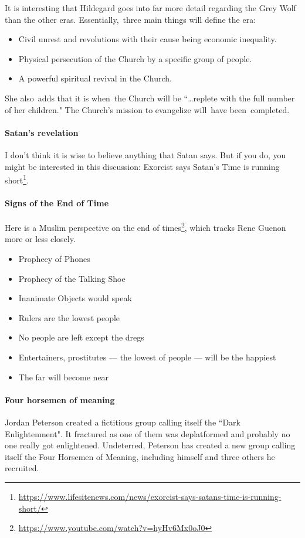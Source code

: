 \begin{quotex}
It is interesting that Hildegard goes into far more detail regarding the Grey Wolf than the other eras. Essentially, three main things will define the era:

\begin{itemize}
\item Civil unrest and revolutions with their cause being economic inequality. 
\item Physical persecution of the Church by a specific group of people. 
\item A powerful spiritual revival in the Church. 
\end{itemize}

She also adds that it is when the Church will be ``…replete with the full number of her children." The Church's mission to evangelize will have been completed.

\end{quotex}
\paragraph{Satan's revelation}
I don't think it is wise to believe anything that Satan says. But if you do, you might be interested in this discussion: Exorcist says Satan's Time is running short\footnote{\url{https://www.lifesitenews.com/news/exorcist-says-satans-time-is-running-short/}}.

\paragraph{Signs of the End of Time}
Here is a Muslim perspective on the end of times\footnote{\url{https://www.youtube.com/watch?v=hyHv6Mx0oJ0}}, which tracks Rene Guenon more or less closely.

\begin{itemize}
\item Prophecy of Phones 
\item Prophecy of the Talking Shoe 
\item Inanimate Objects would speak 
\item Rulers are the lowest people 
\item No people are left except the dregs 
\item Entertainers, prostitutes — the lowest of people — will be the happiest 
\item The far will become near 
\end{itemize}
\paragraph{Four horsemen of meaning}
Jordan Peterson created a fictitious group calling itself the ``Dark Enlightenment". It fractured as one of them was deplatformed and probably no one really got enlightened. Undeterred, Peterson has created a new group calling itself the Four Horsemen of Meaning, including himself and three others he recruited.

